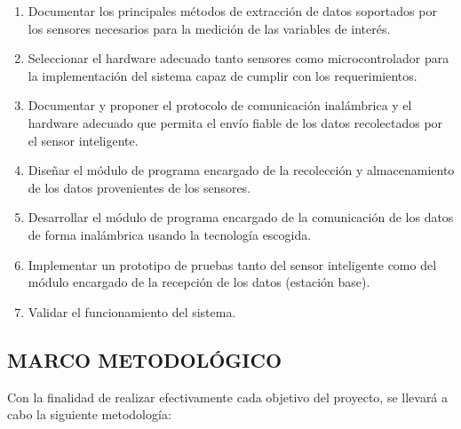 \documentclass[12pt,letterpaper]{article}
\begin{document}
\begin{enumerate}[1.]
	
	
	 \item Documentar los principales métodos de extracción de datos soportados por los sensores necesarios para la medición de las variables de interés.
	 
	 \item Seleccionar el hardware adecuado tanto sensores como microcontrolador para la implementación del sistema capaz de cumplir con los requerimientos.
	 
	 \item Documentar y proponer el protocolo de comunicación inalámbrica y el hardware adecuado que permita el envío fiable de los datos recolectados por el sensor inteligente.
	
	 \item Diseñar el módulo de programa encargado de la recolección y almacenamiento de los datos provenientes de los sensores.
	
	 \item Desarrollar el módulo de programa encargado de la comunicación de los datos de forma inalámbrica usando la tecnología escogida.
	 
	 
	 \item Implementar un prototipo de pruebas tanto del sensor inteligente como del módulo encargado de la recepción de los datos (estación base).
	
	 \item Validar el funcionamiento del sistema.
 	
\end{enumerate}
\newpage



\begin{center}
	
	\section*{ MARCO METODOLÓGICO}
	
\end{center}

\vspace{1cm}

Con la finalidad de realizar efectivamente cada objetivo del proyecto, se llevará a cabo la siguiente metodología:
\bigskip
\end{document}
